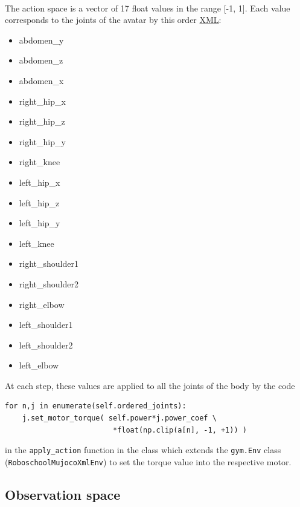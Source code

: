 \documentclass{article}
\begin{document}
  \paragraph{}
  The action space is a vector of 17 float values in the range [-1, 1]. Each
  value corresponds to the joints of the avatar by this order
  \href{https://github.com/openai/roboschool/blob/master/roboschool/mujoco_assets/humanoid_symmetric.xml}{XML}:
  \begin{multicols}{2}
  \begin{itemize}
  \item{abdomen\_y}
  \item{abdomen\_z}
  \item{abdomen\_x}
  \item{right\_hip\_x}
  \item{right\_hip\_z}
  \item{right\_hip\_y}
  \item{right\_knee}
  \item{left\_hip\_x}
  \item{left\_hip\_z}
  \item{left\_hip\_y}
  \item{left\_knee}
  \item{right\_shoulder1}
  \item{right\_shoulder2}
  \item{right\_elbow}
  \item{left\_shoulder1}
  \item{left\_shoulder2}
  \item{left\_elbow}
  \end{itemize}
\end{multicols}
  At each step, these values are applied to all the joints of the body by the code
\begin{verbatim}
for n,j in enumerate(self.ordered_joints):
    j.set_motor_torque( self.power*j.power_coef \
                         *float(np.clip(a[n], -1, +1)) )
\end{verbatim}

in the \verb?apply_action? function in the class which extends the
\verb?gym.Env? class (\verb?RoboschoolMujocoXmlEnv?) to set the torque value
into the respective motor.

\subsection{Observation space}
\end{document}
